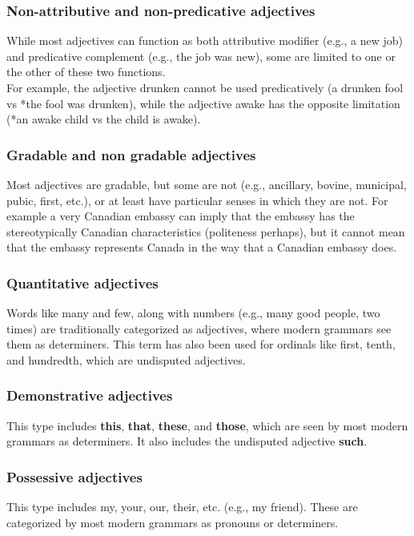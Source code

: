 \subsubsection{Non-attributive and non-predicative adjectives \cite{wiki-eng-adjective}}
While most adjectives can function as both attributive modifier (e.g., a new job) and predicative complement (e.g., the job was new), some are limited to one or the other of these two functions.\\ For example, the adjective drunken cannot be used predicatively (a drunken fool vs *the fool was drunken), while the adjective awake has the opposite limitation (*an awake child vs the child is awake).

\subsubsection{Gradable and non gradable adjectives \cite{wiki-eng-adjective}}
Most adjectives are gradable, but some are not (e.g., ancillary, bovine, municipal, pubic, first, etc.), or at least have particular senses in which they are not. For example a very Canadian embassy can imply that the embassy has the stereotypically Canadian characteristics (politeness perhaps), but it cannot mean that the embassy represents Canada in the way that a Canadian embassy does.


\subsubsection{Quantitative adjectives \cite{wiki-eng-adjective}}
Words like many and few, along with numbers (e.g., many good people, two times) are traditionally categorized as adjectives, where modern grammars see them as determiners. This term has also been used for ordinals like first, tenth, and hundredth, which are undisputed adjectives.


\subsubsection{Demonstrative adjectives \cite{wiki-eng-adjective}}
This type includes \textbf{this}, \textbf{that}, \textbf{these}, and \textbf{those}, which are seen by most modern grammars as determiners. It also includes the undisputed adjective \textbf{such}.


\subsubsection{Possessive adjectives \cite{wiki-eng-adjective}}
This type includes my, your, our, their, etc. (e.g., my friend). These are categorized by most modern grammars as pronouns or determiners.


